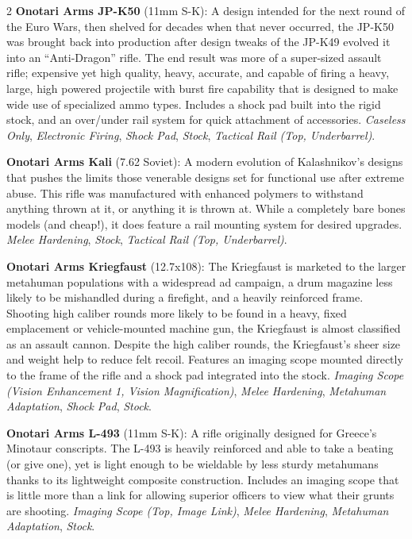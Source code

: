 \documentclass[
  oneside]{article}
\begin{document}
\begin{multicols}{2}
\textbf{Onotari Arms JP-K50} (11mm S-K): A design
intended for the next round of the Euro Wars, then
shelved for decades when that never occurred, the
JP-K50 was brought back into production after
design tweaks of the JP-K49 evolved it into an
``Anti-Dragon'' rifle. The end result was more of
a super-sized assault rifle; expensive yet high
quality, heavy, accurate, and capable of firing a
heavy, large, high powered projectile with burst
fire capability that is designed to make wide use
of specialized ammo types. Includes a shock pad
built into the rigid stock, and an over/under rail
system for quick attachment of accessories.
\emph{Caseless Only}, \emph{Electronic Firing},
\emph{Shock Pad}, \emph{Stock}, \emph{Tactical
Rail (Top, Underbarrel)}.

\textbf{Onotari Arms Kali} (7.62 Soviet): A modern
evolution of Kalashnikov's designs that pushes the
limits those venerable designs set for functional
use after extreme abuse. This rifle was
manufactured with enhanced polymers to withstand
anything thrown at it, or anything it is thrown
at. While a completely bare bones models (and
cheap!), it does feature a rail mounting system
for desired upgrades. \emph{Melee Hardening},
\emph{Stock}, \emph{Tactical Rail (Top,
Underbarrel)}.

\textbf{Onotari Arms Kriegfaust} (12.7x108): The
Kriegfaust is marketed to the larger metahuman
populations with a widespread ad campaign, a drum
magazine less likely to be mishandled during a
firefight, and a heavily reinforced frame.
Shooting high caliber rounds more likely to be
found in a heavy, fixed emplacement or
vehicle-mounted machine gun, the Kriegfaust is
almost classified as an assault cannon. Despite
the high caliber rounds, the Kriegfaust's sheer
size and weight help to reduce felt recoil.
Features an imaging scope mounted directly to the
frame of the rifle and a shock pad integrated into
the stock. \emph{Imaging Scope (Vision Enhancement
1, Vision Magnification)}, \emph{Melee Hardening},
\emph{Metahuman Adaptation}, \emph{Shock Pad},
\emph{Stock}.

\textbf{Onotari Arms L-493} (11mm S-K): A rifle
originally designed for Greece's Minotaur
conscripts. The L-493 is heavily reinforced and
able to take a beating (or give one), yet is light
enough to be wieldable by less sturdy metahumans
thanks to its lightweight composite construction.
Includes an imaging scope that is little more than
a link for allowing superior officers to view what
their grunts are shooting. \emph{Imaging Scope
(Top, Image Link)}, \emph{Melee Hardening},
\emph{Metahuman Adaptation}, \emph{Stock}.


\end{multicols}
\end{document}
